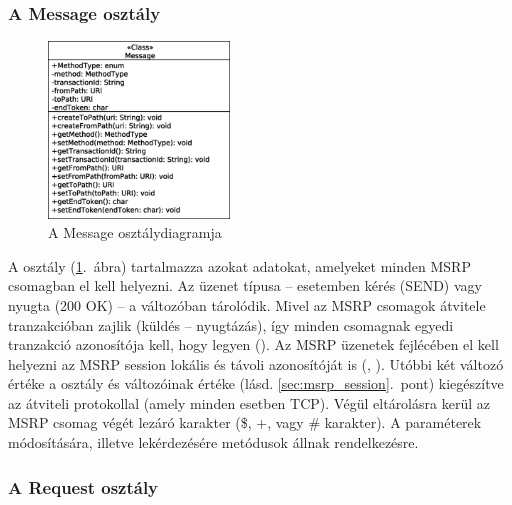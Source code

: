 \newpage
\subsubsection*{A Message osztály}
\label{sec:msrp_message}

\begin{figure}
  \vspace{-55pt}
  \begin{center}
    \includegraphics[width=0.43\textwidth]{img/class_diagrams/Message.eps}
  \end{center}
  \vspace{-15pt}
  \captionsetup{font=scriptsize}
  \caption{A Message osztálydiagramja}
   \label{fig:class_message}
  \vspace{-10pt}
\end{figure}
A  osztály (\ref{fig:class_message}.~ábra) tartalmazza azokat adatokat, amelyeket minden MSRP csomagban el kell helyezni. Az üzenet típusa -- esetemben kérés (SEND) vagy nyugta (200 OK) -- a  változóban tárolódik. Mivel az MSRP csomagok átvitele tranzakcióban zajlik (küldés -- nyugtázás), így minden csomagnak egyedi tranzakció azonosítója kell, hogy legyen (). Az MSRP üzenetek fejlécében el kell helyezni az MSRP session lokális és távoli azonosítóját is (, ). Utóbbi két változó értéke a  osztály  és  változóinak értéke (lásd. \ref{sec:msrp_session}.~pont) kiegészítve az átviteli protokollal (amely minden esetben TCP). Végül eltárolásra kerül az MSRP csomag végét lezáró karakter (\$, +, vagy  \# karakter). A paraméterek módosítására, illetve lekérdezésére metódusok állnak rendelkezésre.

\subsubsection*{A Request osztály}
\label{sec:msrp_request}


